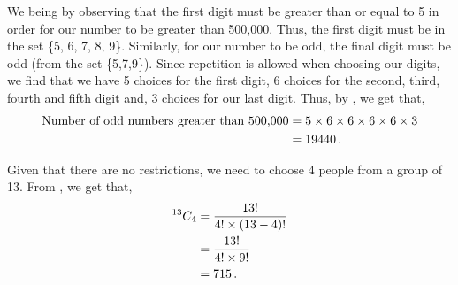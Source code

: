 %
%


\begin{subquestions}
	
\subquestion

We being by observing that the first digit must be greater than or equal to 5 in order for our number to be greater than 500,000. Thus, the first digit must be in the set \{5, 6, 7, 8, 9\}. Similarly, for our number to be odd, the final digit must be odd (from the set \{5,7,9\}). Since repetition is allowed when choosing our digits, we find that we have 5 choices for the first digit, 6 choices for the second, third, fourth and fifth digit and, 3 choices for our last digit. Thus, by , we get that,
\begin{align}
	\text{Number of odd numbers greater than 500,000} & = 5 \times 6 \times 6 \times 6 \times 6 \times 3 \nonumber \\
	                                                  & = 19440 \,.
\end{align}


\subquestion

\begin{subsubquestions}
	
\subsubquestion

Given that there are no restrictions, we need to choose 4 people from a group of 13. From , we get that,
\begin{align}
	^{13}C_4 & = \frac{13!}{4! \times (13-4)!} \nonumber \\
	         & = \frac{13!}{4! \times 9!} \nonumber \\
	         & = 715 \,.
\end{align}
	

\end{subsubquestions}
\end{subquestions}
